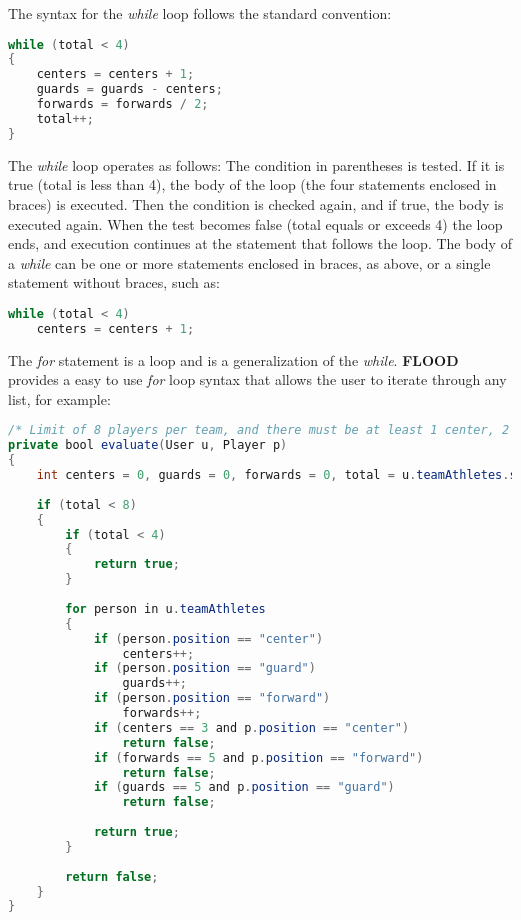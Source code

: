 \documentclass[12pt]{report}
\begin{document}
The syntax for the \textit{while} loop follows the standard convention:

\begin{singlespace}
\begin{lstlisting}[language=Java,label=some-code,caption=While loop]
while (total < 4)
{
	centers = centers + 1;
	guards = guards - centers;
	forwards = forwards / 2;
	total++;
}
\end{lstlisting}
\end{singlespace}

The \textit{while} loop operates as follows: The condition in parentheses is tested. If it is true (total is less than 4), the body of the loop (the four statements enclosed in braces) is executed. Then the condition is checked again, and if true, the body is executed again. When the test becomes false (total equals or exceeds 4) the loop ends, and execution continues at the statement that follows the loop. The body of a \textit{while} can be one or more statements enclosed in braces, as above, or a single statement without braces, such as:

\begin{singlespace}
\begin{lstlisting}[language=Java,label=some-code,caption=Single statement while loop]
while (total < 4)
	centers = centers + 1;
\end{lstlisting}
\end{singlespace}

The \textit{for} statement is a loop and is a generalization of the \textit{while}. \textbf{FLOOD} provides a easy to use \textit{for} loop syntax that allows the user to iterate through any list, for example:

\begin{singlespace}
\begin{lstlisting}[language=Java,label=some-code,caption=For loop]
/* Limit of 8 players per team, and there must be at least 1 center, 2 guards and 2 forwards per team. */
private bool evaluate(User u, Player p)
{
	int centers = 0, guards = 0, forwards = 0, total = u.teamAthletes.size();
	
	if (total < 8)
	{
		if (total < 4)
		{
			return true;
		}
		
		for person in u.teamAthletes
		{
			if (person.position == "center")
				centers++;
			if (person.position == "guard")
				guards++;
			if (person.position == "forward")
				forwards++;
			if (centers == 3 and p.position == "center")
				return false;
			if (forwards == 5 and p.position == "forward")
				return false;
			if (guards == 5 and p.position == "guard")
				return false;
		
			return true;
		}
		
		return false;
	}
}
\end{lstlisting}
\end{singlespace}
\end{document}
